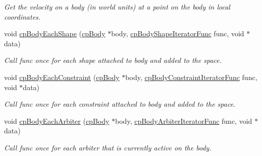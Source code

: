 \begin{DoxyCompactItemize}
\begin{DoxyCompactList}\small\item\em Get the velocity on a body (in world units) at a point on the body in local coordinates. \end{DoxyCompactList}\item 
\hypertarget{group__cp_body_ga51f56b6099dc8321ce284ecc6241b285}{void \hyperlink{group__cp_body_ga51f56b6099dc8321ce284ecc6241b285}{cp\-Body\-Each\-Shape} (\hyperlink{structcp_body}{cp\-Body} $\ast$body, \hyperlink{group__cp_body_ga2a71c91a297ece9ab06101df4b726645}{cp\-Body\-Shape\-Iterator\-Func} func, void $\ast$data)}\label{group__cp_body_ga51f56b6099dc8321ce284ecc6241b285}

\begin{DoxyCompactList}\small\item\em Call {\ttfamily func} once for each shape attached to {\ttfamily body} and added to the space. \end{DoxyCompactList}\item 
\hypertarget{group__cp_body_ga377e83841ec8a67ca93685cb0bd6525e}{void \hyperlink{group__cp_body_ga377e83841ec8a67ca93685cb0bd6525e}{cp\-Body\-Each\-Constraint} (\hyperlink{structcp_body}{cp\-Body} $\ast$body, \hyperlink{group__cp_body_ga79c674e7767d6ff8769a9676404f589b}{cp\-Body\-Constraint\-Iterator\-Func} func, void $\ast$data)}\label{group__cp_body_ga377e83841ec8a67ca93685cb0bd6525e}

\begin{DoxyCompactList}\small\item\em Call {\ttfamily func} once for each constraint attached to {\ttfamily body} and added to the space. \end{DoxyCompactList}\item 
\hypertarget{group__cp_body_gacc958b3adad795e718682bea830d4135}{void \hyperlink{group__cp_body_gacc958b3adad795e718682bea830d4135}{cp\-Body\-Each\-Arbiter} (\hyperlink{structcp_body}{cp\-Body} $\ast$body, \hyperlink{group__cp_body_gacdd17a9f98ca6e6c088b72f7d5f32ea3}{cp\-Body\-Arbiter\-Iterator\-Func} func, void $\ast$data)}\label{group__cp_body_gacc958b3adad795e718682bea830d4135}

\begin{DoxyCompactList}\small\item\em Call {\ttfamily func} once for each arbiter that is currently active on the body. \end{DoxyCompactList}\end{DoxyCompactItemize}

